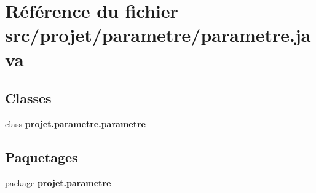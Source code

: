 \section{\-Référence du fichier src/projet/parametre/parametre.java}
\label{parametre_8java}
\subsection*{\-Classes}
\begin{DoxyCompactItemize}
\item 
class {\bf projet.\-parametre.\-parametre}
\end{DoxyCompactItemize}
\subsection*{\-Paquetages}
\begin{DoxyCompactItemize}
\item 
package {\bf projet.\-parametre}
\end{DoxyCompactItemize}
